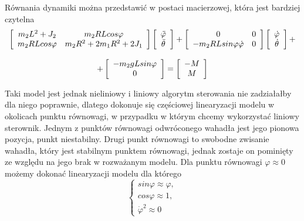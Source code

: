 Równania dynamiki można przedstawić w postaci macierzowej, która jest bardziej czytelna
$$
    \begin{array}{cc}
        \left[ \begin{array}{cc}
        m_2L^2 + J_2 & m_2RLcos\varphi \\
        m_2RLcos\varphi & m_2R^2 + 2m_1R^2 + 2J_1
        \end{array} \right]
        \left[ \begin{array}{c}
        \Ddot{\varphi} \\
        \Ddot{\theta}
        \end{array} \right]
        +
        \left[ \begin{array}{cc}
        0 & 0 \\
        -m_2RLsin\varphi\dot{\varphi} & 0
        \end{array} \right]
        \left[ \begin{array}{c}
        \dot{\varphi} \\
        \dot{\theta}
        \end{array} \right]
        + \\ \\ +
        \left[ \begin{array}{c}
        -m_2gLsin\varphi \\
        0
        \end{array} \right]
        = 
        \left[ \begin{array}{c}
        -M \\
        M
        \end{array} \right]
    \end{array}
$$

Taki model jest jednak nieliniowy i liniowy algorytm sterowania nie zadziałałby dla niego poprawnie, dlatego dokonuje się częściowej linearyzacji modelu w okolicach punktu równowagi, w przypadku w którym chcemy wykorzystać liniowy sterownik. Jednym z punktów równowagi odwróconego wahadła jest jego pionowa pozycja, punkt niestabilny. Drugi punkt równowagi to swobodne zwisanie wahadła, który jest stabilnym punktem równowagi, jednak zostaje on pominięty ze względu na jego brak w rozważanym modelu. Dla punktu równowagi $\varphi \approx 0$ możemy dokonać linearyzacji modelu dla którego
$$
    \left\{
    \begin{array}{c}
    sin\varphi \approx \varphi, \\
    cos\varphi \approx 1, \\
    \dot{\varphi}^2 \approx 0
    \end{array}
    \right.
$$

